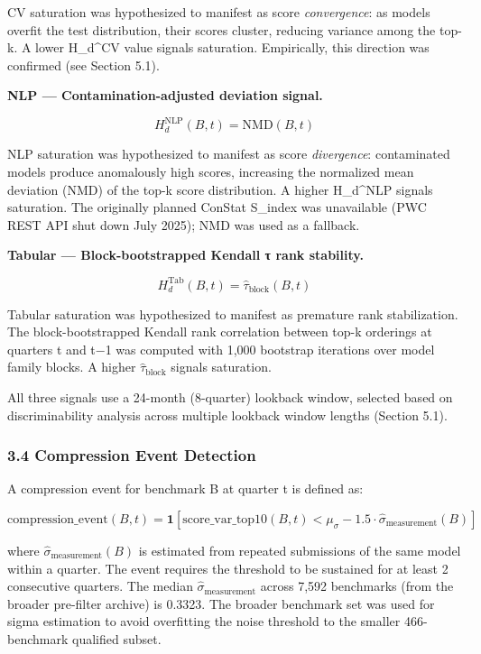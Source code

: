 CV saturation was hypothesized to manifest as score \textit{convergence}: as models overfit the test distribution, their scores cluster, reducing variance among the top-k. A lower H_d^CV value signals saturation. Empirically, this direction was confirmed (see Section 5.1).

\textbf{NLP — Contamination-adjusted deviation signal.}

$$H_d^{\text{NLP}}(B, t) = \text{NMD}(B, t)$$

NLP saturation was hypothesized to manifest as score \textit{divergence}: contaminated models produce anomalously high scores, increasing the normalized mean deviation (NMD) of the top-k score distribution. A higher H_d^NLP signals saturation. The originally planned ConStat S_index was unavailable (PWC REST API shut down July 2025); NMD was used as a fallback.

\textbf{Tabular — Block-bootstrapped Kendall τ rank stability.}

$$H_d^{\text{Tab}}(B, t) = \hat{\tau}_{\text{block}}(B, t)$$

Tabular saturation was hypothesized to manifest as premature rank stabilization. The block-bootstrapped Kendall rank correlation between top-k orderings at quarters t and t−1 was computed with 1,000 bootstrap iterations over model family blocks. A higher $\hat{\tau}_{\text{block}}$ signals saturation.

All three signals use a 24-month (8-quarter) lookback window, selected based on discriminability analysis across multiple lookback window lengths (Section 5.1).

\subsubsection{3.4 Compression Event Detection}

A compression event for benchmark B at quarter t is defined as:

$$\text{compression\_event}(B, t) = \mathbf{1}\left[\text{score\_var\_top10}(B, t) < \mu_\sigma - 1.5 \cdot \hat{\sigma}_{\text{measurement}}(B)\right]$$

where $\hat{\sigma}_{\text{measurement}}(B)$ is estimated from repeated submissions of the same model within a quarter. The event requires the threshold to be sustained for at least 2 consecutive quarters. The median $\hat{\sigma}_{\text{measurement}}$ across 7,592 benchmarks (from the broader pre-filter archive) is 0.3323. The broader benchmark set was used for sigma estimation to avoid overfitting the noise threshold to the smaller 466-benchmark qualified subset.

